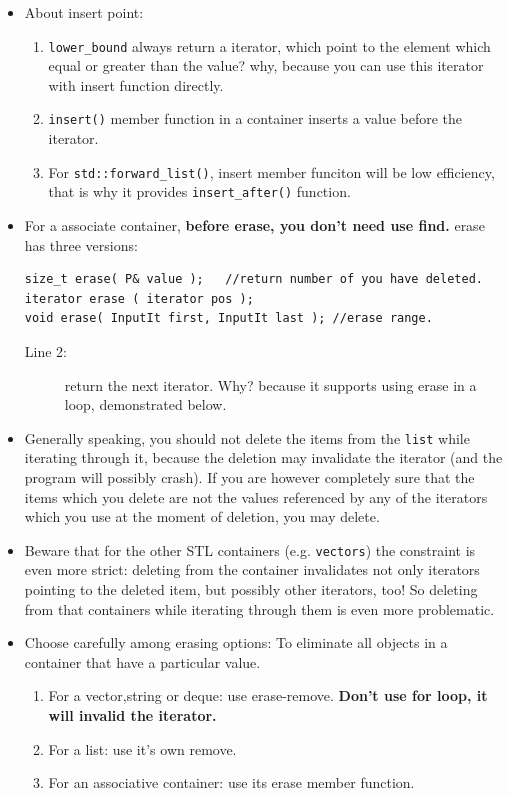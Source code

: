 \documentclass[a4paper,11pt,twoside]{book}
\begin{document}
\begin{itemize}
\item About insert point:
\begin{enumerate}
	\item \texttt{lower\_bound} always return a iterator, which point to the element which equal or greater than the value? why, because you can use this iterator with insert function directly.
	
	\item \texttt{insert()} member function in a container inserts a value before the iterator. 
	
	\item For \texttt{std::forward\_list()}, insert member funciton will be low efficiency, that is why it provides \texttt{insert\_after()} function.
\end{enumerate}


\item For a associate container, \textbf{before erase, you don't need use find.} erase has three versions:
\begin{lstlisting}[numbers=none]
size_t erase( P& value );   //return number of you have deleted.
iterator erase ( iterator pos );
void erase( InputIt first, InputIt last ); //erase range.
\end{lstlisting}
\begin{description}
	\item[Line 2:] return the next iterator. Why? because it supports using erase in a loop, demonstrated below.
\end{description}

	\item Generally speaking, you should not delete the items from the \texttt{list} while iterating through it, because the deletion may invalidate the iterator (and the program will possibly crash). If you are however completely sure that the items which you delete are not the values referenced by any of the iterators which you use at the moment of deletion, you may delete.

	\item Beware that for the other STL containers (e.g. \texttt{vectors}) the constraint is even more strict: deleting from the container invalidates not only iterators pointing to the deleted item, but possibly other iterators, too! So deleting from that containers while iterating through them is even more problematic.

	\item Choose carefully among erasing options:  To eliminate all objects in a container that have a particular value.
	\begin{enumerate}
		\item For a vector,string or deque: use erase-remove. \textbf{Don't use for loop, it will invalid the iterator.}
		\item For a list: use it's own remove.
		\item For an associative container: use its erase member function.		
	\end{enumerate}



\end{itemize}
\end{document}
